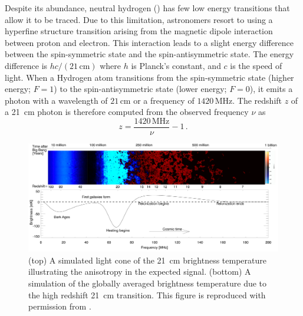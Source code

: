 \begin{bibunit}
Despite its abundance, neutral hydrogen () has few low energy transitions that allow it to
be traced.  Due to this limitation, astronomers resort to using a hyperfine structure transition
arising from the magnetic dipole interaction between proton and electron. This interaction leads to
a slight energy difference between the spin-symmetric state and the spin-antisymmetric state. The
energy difference is $hc / (21\,\text{cm})$ where $h$ is Planck's constant, and $c$ is the speed of
light.  When a Hydrogen atom transitions from the spin-symmetric state (higher energy; $F=1$) to the
spin-antisymmetric state (lower energy; $F=0$), it emits a photon with a wavelength of
$21\,\text{cm}$ or a frequency of $1420\,\text{MHz}$. The redshift $z$ of a 21~cm photon is
therefore computed from the observed frequency $\nu$ as
\begin{equation}
    z = \frac{1420\,\text{MHz}}{\nu} - 1\,.
\end{equation}

\begin{figure}[t]
    \centering
    \includegraphics[width=\textwidth]{figures/chapter1/pritchard-2012-global-signal}
    \caption{
        (top) A simulated light cone of the 21~cm brightness temperature illustrating the
        anisotropy in the expected signal.
        (bottom) A simulation of the globally averaged brightness temperature due to the high
        redshift 21~cm transition.
        This figure is reproduced with permission from \citet{2012RPPh...75h6901P}.
    }
    \label{fig:pritchard-global-signal}
\end{figure}


\end{bibunit}
